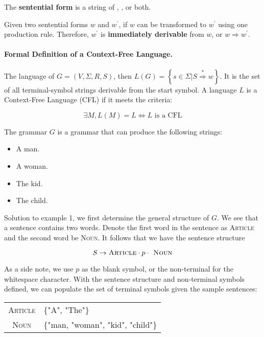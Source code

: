 \begin{defn}
    The \textbf{sentential form} is a string of , , or both. 
\end{defn}

\begin{defn}
    Given two sentential forms $w$ and $w^\prime$, if $w$ can be transformed to $w^\prime$ using one production rule. Therefore, $w^\prime$ is \textbf{immediately derivable} from $w$, or $w\Rightarrow w^\prime$.
\end{defn}

\paragraph{Formal Definition of a Context-Free Language.} The language of $G=\left(V,\Sigma,R,S\right)$, then $L(G)=\left\{s\in\Sigma|S\overset{*}{\Rightarrow}w\right\}$. It is the set of all terminal-symbol strings derivable from the start symbol.  A language $L$ is a Context-Free Language (CFL) if it meets the criteria: 

\[
\exists M, L(M)=L \Longleftrightarrow L\text{ is a CFL}
\]

\begin{ex}
    The grammar $G$ is a grammar that can produce the following strings:
\end{ex}
\begin{itemize}
    \item A man.
    \item A woman.
    \item The kid.
    \item The child.
\end{itemize}

Solution to example 1, we first determine the general structure of $G$. We see that a sentence contains two words. Denote the first word in the sentence as \textsc{Article} and the second word be \textsc{Noun}. It follows that we have the sentence structure

\[
    S\to \textsc{Article} \cdot p \cdot \textsc{ Noun}
\]

As a side note, we use $p$ as the blank symbol, or the non-terminal for the whitespace character. With the sentence structure and non-terminal symbols defined, we can populate the set of terminal symbols given the sample sentences:

\begin{center}
    \begin{tabular}{cl}
         \textsc{Article} & \{"A", "The"\}  \\
         \textsc{Noun}    & \{"man, "woman", "kid", "child"\}
    \end{tabular}
\end{center}

